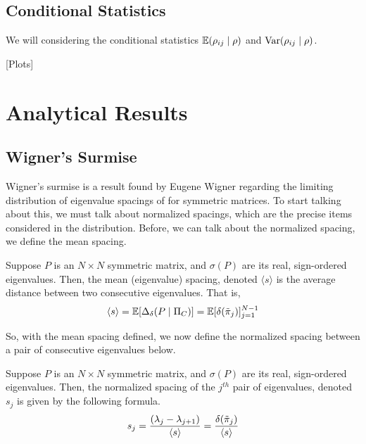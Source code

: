 \subsection{Conditional Statistics}

We will considering the conditional statistics $\mathbb{E}({\rho}_{ij} \mid \rho)$ and $\text{Var}({\rho}_{ij} \mid \rho)$.

[Plots]

\newpage
\section{Analytical Results}


\subsection{Wigner's Surmise}

Wigner's surmise is a result found by Eugene Wigner regarding the limiting distribution of eigenvalue spacings of for symmetric matrices.
To start talking about this, we must talk about normalized spacings, which are the precise items considered in the distribution.
Before, we can talk about the normalized spacing, we define the mean spacing.

\begin{definition}
Suppose $P$ is an $N \times N$ symmetric matrix, and $\sigma(P)$ are its real, sign-ordered eigenvalues.
Then, the mean (eigenvalue) spacing, denoted $\langle s \rangle$ is the average distance between two consecutive eigenvalues. That is,
$$\langle s \rangle = \mathbb{E}[\Delta_\delta(P \mid \Pi_C)] = \mathbb{E}[\delta({\tilde{\pi}}_{j})]_{j = 1}^{N - 1}$$
\end{definition}

\noindent So, with the mean spacing defined, we now define the normalized spacing between a pair of consecutive eigenvalues below.

\begin{definition}
Suppose $P$ is an $N \times N$ symmetric matrix, and $\sigma(P)$ are its real, sign-ordered eigenvalues.
Then, the normalized spacing of the $j^{th}$ pair of eigenvalues, denoted $s_j$ is given by the following formula.
$$s_j = \frac{(\lambda_j - \lambda_{j+1})}{\langle s \rangle} = \frac{\delta({\tilde{\pi}}_{j})}{\langle s \rangle}$$
\end{definition}

